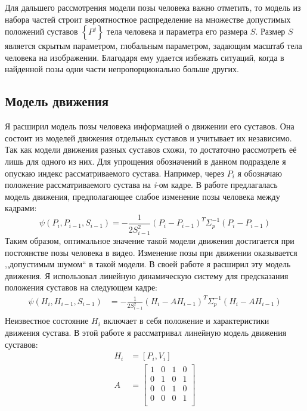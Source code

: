 Для дальшего рассмотрения модели позы человека важно отметить, то модель из набора частей строит вероятностное распределение на множестве допустимых положений суставов $\left\{P^j\right\}$ тела человека и параметра его размера $S$. Размер $S$ является скрытым параметром, глобальным параметром, задающим масштаб тела человека на изображении. Благодаря ему удается избежать ситуаций, когда в найденной позы одни части непропорционально больше других.

\subsection{Модель движения}

Я расширил модель позы человека информацией о движении его суставов. Она состоит из моделей движения отдельных суставов и учитывает их независимо. Так как модели движения разных суставов схожи, то достаточно рассмотреть её лишь для одного из них. Для упрощения обозначений в данном подразделе я опускаю индекс рассматриваемого сустава. Например, через $P_i$ я обозначаю положение рассматриваемого сустава на {\textit i-ом} кадре. В работе \cite{park2011n} предлагалась модель движения, предполагающее слабое изменение позы человека между кадрами:
\begin{equation*}
	\psi(P_i, P_{i-1}, S_{i-1}) = -\frac{1} {2 S_{i-1}^2}(P_i - P_{i-1})^T \Sigma_p^{-1} (P_i - P_{i-1})
\end{equation*}
Таким образом, оптимальное значение такой модели движения достигается при постоянстве позы человека в видео. Изменение позы при движении оказывается ,,допустимым шумом`` в такой модели. В своей работе я расширил эту модель движения. Я использовал линейную динамическую систему для предсказания положения суставов на следующем кадре:
\begin{equation}
	\begin{aligned}
		\psi(H_i, H_{i-1}, S_{i-1}) &=
			-\frac{1}{2 S_{i-1}^2} (H_i - A H_{i-1})^T \Sigma_p^{-1} (H_i - A H_{i-1}) \\
	\end{aligned}
\end{equation}
Неизвестное состояние $H_i$ включает в себя положение и характеристики движения сустава. В этой работе я рассматривал линейную модель движения суставов:
\begin{equation}
	\begin{aligned}
		H_i &= \left[P_i, V_i\right] \\
		A &=
			\begin{bmatrix}
			1 & 0 & 1 & 0 \\
			0 & 1 & 0 & 1 \\
			0 & 0 & 1 & 0 \\
			0 & 0 & 0 & 1 \\
			\end{bmatrix} \\
	\end{aligned}
\end{equation}

